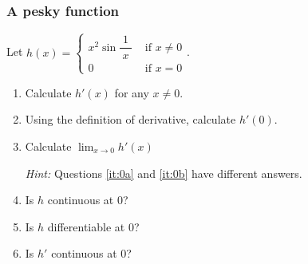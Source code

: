 \documentclass[14pt]{beamer}
\begin{document}

	\begin{frame}[t]
		\frametitle{A pesky function}

		Let $\displaystyle h(x) =
		\begin{cases}
			x^{2}\sin \dfrac{\;1\;}{x} & \text{ if }x \neq 0 \\
			0                          & \text{ if }x=0
		\end{cases}$.

		\begin{enumerate}
			\item Calculate $\displaystyle h'(x)$ for any $x \neq 0$.

			\item \label{it:0a} Using the definition of derivative, calculate
				$\displaystyle h'(0)$.

			\item \label{it:0b} Calculate $\displaystyle \lim_{x \to 0}h'(x)$

				\vspace{.2cm}
				{\fontsize{13}{13}\selectfont \emph{Hint:} Questions \ref{it:0a} and \ref{it:0b} have different answers.}

				\vspace{.2cm}

			\item Is $h$ continuous at $0$?

			\item Is $h$ differentiable at $0$?

			\item Is $h'$ continuous at $0$?
		\end{enumerate}
	\end{frame}



\end{document}
